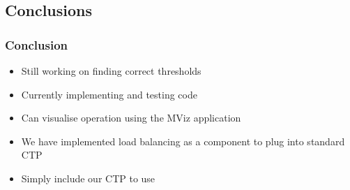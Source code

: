 \documentclass{beamer}
\begin{document}
\subsection{Conclusions}

\begin{frame}
  \frametitle{Conclusion}
  \begin{itemize}
    \item Still working on finding correct thresholds
    \item Currently implementing and testing code
    \item Can visualise operation using the MViz application
    \item We have implemented load balancing as a component to plug into
    standard CTP
    \item Simply include our CTP to use
  \end{itemize}
\end{frame}  
\end{document}
